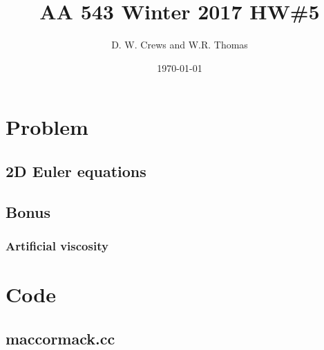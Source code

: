 \documentclass[11pt]{article}
\title{AA 543 Winter 2017 HW\#5}
\author{D. W. Crews and W.R. Thomas}
\date{\today}
\begin{document}
\maketitle

\section{Problem}
	\subsection{2D Euler equations}
	
		
	
\subsection{Bonus}
	\subsubsection{Artificial viscosity}
	
	

\pagebreak
\appendix
\section{Code}
	\subsection{maccormack.cc}
%		
		
	
\end{document}
